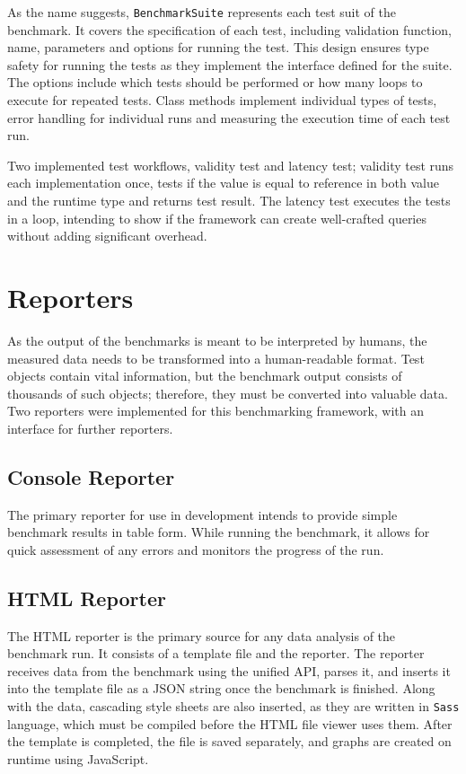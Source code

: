 As the name suggests, \texttt{BenchmarkSuite} represents each test suit of the
benchmark. It covers the specification of each test, including validation
function, name, parameters and options for running the test. This design ensures
type safety for running the tests as they implement the interface defined for
the suite. The options include which tests should be performed or how many loops
to execute for repeated tests. Class methods implement individual types of
tests, error handling for individual runs and measuring the execution time of
each test run.

Two implemented test workflows, validity test and latency test; validity test
runs each implementation once, tests if the value is equal to reference in both
value and the runtime type and returns test result. The latency test executes
the tests in a loop, intending to show if the framework can create well-crafted
queries without adding significant overhead.

\section{Reporters}
As the output of the benchmarks is meant to be interpreted by humans, the
measured data needs to be transformed into a human-readable format. Test objects
contain vital information, but the benchmark output consists of thousands of
such objects; therefore, they must be converted into valuable data. Two
reporters were implemented for this benchmarking framework, with an interface
for further reporters.

\subsection{Console Reporter}
The primary reporter for use in development intends to provide simple benchmark
results in table form. While running the benchmark, it allows for quick
assessment of any errors and monitors the progress of the run.

\subsection{HTML Reporter}
The HTML reporter is the primary source for any data analysis of the benchmark
run. It consists of a template file and the reporter. The reporter receives data
from the benchmark using the unified API, parses it, and inserts it into the
template file as a JSON string once the benchmark is finished. Along with the
data, cascading style sheets are also inserted, as they are written in
\texttt{Sass} language, which must be compiled before the HTML file viewer uses
them. After the template is completed, the file is saved separately, and graphs
are created on runtime using JavaScript.


